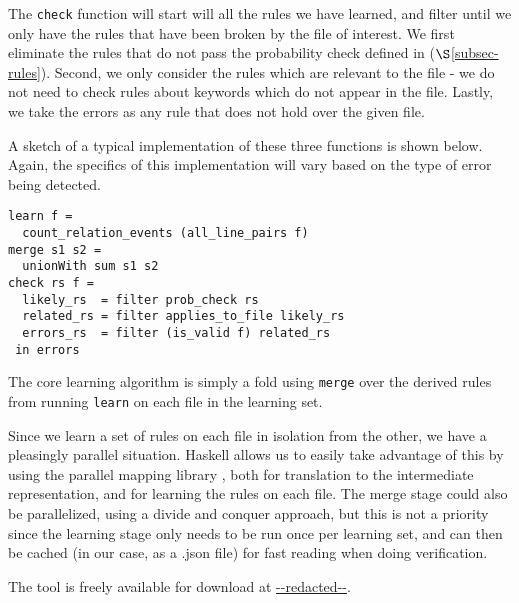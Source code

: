 The \lstinline{check} function will start will all the rules we have learned, and filter until we only have the rules that have been broken by the file of interest.
We first eliminate the rules that do not pass the probability check defined in ($\S$\ref{subsec-rules}).
Second, we only consider the rules which are relevant to the file - we do not need to check rules about keywords which do not appear in the file.
Lastly, we take the errors as any rule that does not hold over the given file.

A sketch of a typical implementation of these three functions is shown below. Again, the specifics of this implementation will vary based on the type of error being detected. 

\begin{lstlisting}
learn f = 
  count_relation_events (all_line_pairs f)
merge s1 s2 = 
  unionWith sum s1 s2
check rs f = 
  likely_rs  = filter prob_check rs
  related_rs = filter applies_to_file likely_rs
  errors_rs  = filter (is_valid f) related_rs
 in errors
\end{lstlisting}

The core learning algorithm is simply a fold using \lstinline{merge} over the derived rules from running \lstinline{learn} on each file in the learning set.


Since we learn a set of rules on each file in isolation from the other, we have a pleasingly parallel situation.
Haskell allows us to easily take advantage of this by using the parallel mapping library \cite{parallel}, both for translation to the intermediate representation, and for learning the rules on each file.
The merge stage could also be parallelized, using a divide and conquer approach, but this is not a priority since the learning stage only needs to be run once per learning set, and can then be cached (in our case, as a .json file) for fast reading when doing verification.

The tool is freely available for download at \url{--redacted--}.